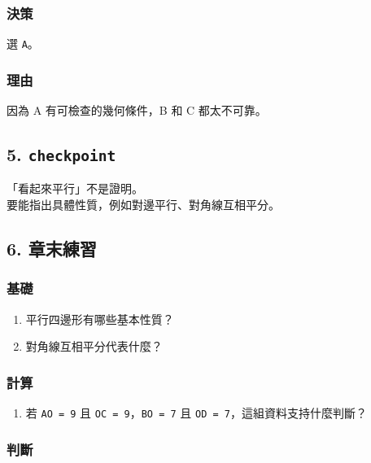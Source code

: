 \documentclass[
  chinese,
  12pt,
  a4paper,
  oneside]{article}
\providecommand{\tightlist}{%
  \setlength{\itemsep}{0pt}\setlength{\parskip}{0pt}}
\begin{document}
\subsubsection{決策}\label{ux6c7aux7b56-5}

選 \texttt{A}。

\subsubsection{理由}\label{ux7406ux7531-1}

因為 A 有可檢查的幾何條件，B 和 C 都太不可靠。

\subsection{\texorpdfstring{5.
\texttt{checkpoint}}{5. checkpoint}}\label{checkpoint-9}

「看起來平行」不是證明。\\
要能指出具體性質，例如對邊平行、對角線互相平分。

\subsection{6. 章末練習}\label{ux7ae0ux672bux7df4ux7fd2-4}

\subsubsection{基礎}\label{ux57faux790e-4}

\begin{enumerate}
\def\labelenumi{\arabic{enumi}.}
\tightlist
\item
  平行四邊形有哪些基本性質？
\item
  對角線互相平分代表什麼？
\end{enumerate}

\subsubsection{計算}\label{ux8a08ux7b97-4}

\begin{enumerate}
\def\labelenumi{\arabic{enumi}.}
\setcounter{enumi}{2}
\tightlist
\item
  若 \texttt{AO\ =\ 9} 且 \texttt{OC\ =\ 9}，\texttt{BO\ =\ 7} 且
  \texttt{OD\ =\ 7}，這組資料支持什麼判斷？
\end{enumerate}

\subsubsection{判斷}\label{ux5224ux65b7-6}
\end{document}
